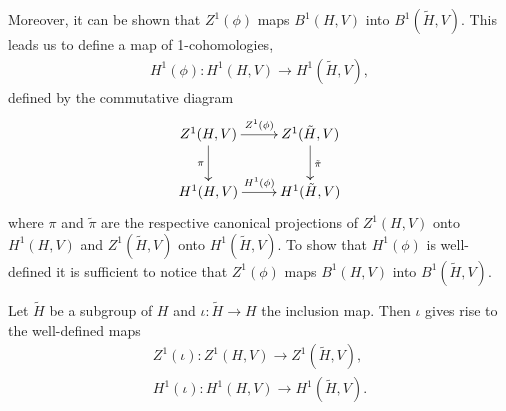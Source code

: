 Moreover, it can be shown that $Z^1(\phi)$ maps $B^1(H, V)$ into $B^1(\tilde{H}, V)$. This leads us to define a map of 1-cohomologies,
\begin{align*}
	H^1(\phi):H^1(H, V) \rightarrow H^1(\tilde{H}, V),
\end{align*}
defined by the commutative diagram
\begin{align}
	\xymatrix{
	Z^1(H, V) \ar[d]_{\pi} \ar[r]^{Z^1(\phi)} & Z^1(\tilde{H}, V) \ar[d]^{\tilde{\pi}}\\
	H^1(H, V) \ar[r]^{H^1(\phi)} & H^1(\tilde{H}, V)
	}
\end{align}
where $\pi$ and $\tilde\pi$ are the respective canonical projections of $Z^1(H, V)$ onto $H^1(H, V)$ and $Z^1(\tilde{H}, V)$ onto $H^1(\tilde{H}, V)$. To show that $H^1(\phi)$ is well-defined it is sufficient to notice that $Z^1(\phi)$ maps $B^1(H, V)$ into $B^1(\tilde{H}, V)$.

\begin{example}
Let $\tilde{H}$ be a subgroup of $H$ and $\iota:\tilde{H}\rightarrow H$ the inclusion map. Then $\iota$ gives rise to the well-defined maps
\begin{align*}
  Z^1(\iota): Z^1(H, V) \rightarrow Z^1(\tilde{H}, V), \\
H^1(\iota):H^1(H, V)\rightarrow H^1(\tilde{H}, V).
\end{align*}
\end{example}

